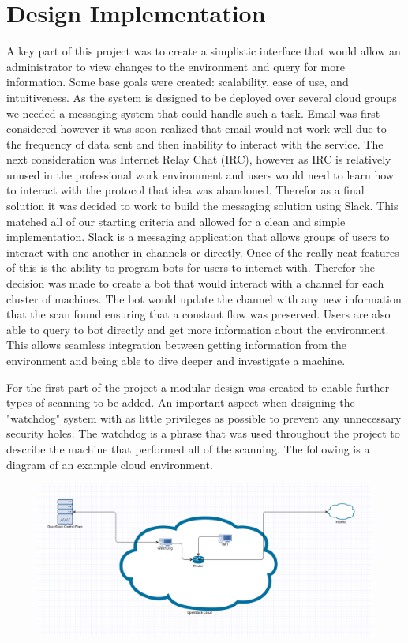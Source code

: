 \documentclass[12pt]{article}
\begin{document}
\section{Design Implementation}
A key part of this project was to create a simplistic interface that would allow an administrator to view changes to the environment and query for more information. Some base goals were created: scalability, ease of use, and intuitiveness. As the system is designed to be deployed over several cloud groups we needed a messaging system that could handle such a task. Email was first considered however it was soon realized that email would not work well due to the frequency of data sent and then inability to interact with the service. The next consideration was Internet Relay Chat (IRC), however as IRC is relatively unused in the professional work environment and users would need to learn how to interact with the protocol that idea was abandoned. Therefor as a final solution it was decided to work to build the messaging solution using Slack. This matched all of our starting criteria and allowed for a clean and simple implementation. Slack is a messaging application that allows groups of users to interact with one another in channels or directly. Once of the really neat features of this is the ability to program bots for users to interact with. Therefor the decision was made to create a bot that would interact with a channel for each cluster of machines. The bot would update the channel with any new information that the scan found ensuring that a constant flow was preserved. Users are also able to query to bot directly and get more information about the environment. This allows seamless integration between getting information from the environment and being able to dive deeper and investigate a machine.

For the first part of the project a modular design was created to enable further types of scanning to be added. An important aspect when designing the "watchdog" system with as little privileges as possible to prevent any unnecessary security holes. The watchdog is a phrase that was used throughout the project to describe the machine that performed all of the scanning. The following is a diagram of an example cloud environment.

\begin{figure}[H]
    \includegraphics[scale=.3]{./pic/flowchart.png}
\end{figure}
\end{document}
